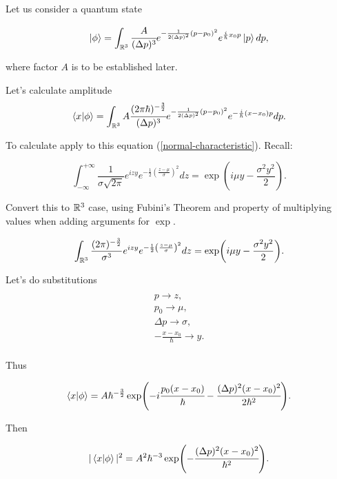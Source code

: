 \documentclass[main.tex]{subfiles}
\begin{document}
Let us consider a quantum state

\begin{equation}
\ket{\phi} = \int_{\mathbb{R}^3} \cfrac{A}{(\Delta p)^3} e^{-\frac{1}{2(\Delta p)^2}(p - p_0)^2} e^{\frac{i}{\hbar}x_0 p}\ket{p} dp,
\end{equation}

where factor $A$ is to be established later. 

Let's calculate amplitude 
\begin{equation}
\bra{x}\ket{\phi} = \int_{\mathbb{R}^3} A \cfrac{ (2\pi\hbar)^{-\frac{3}{2}}}{(\Delta p)^3} e^{-\frac{1}{2(\Delta p)^2}(p - p_0)^2} e^{-\frac{i}{\hbar}(x - x_0) p} dp.
\end{equation}


To calculate apply to this equation (\ref{normal-characteristic}). Recall:

\begin{equation}
\int^{+\infty}_{-\infty} \frac{1}{\sigma \sqrt{2\pi} } e^{izy} e^{-\frac{1}{2}\left(\frac{z-\mu}{\sigma}\right)^2}dz = \exp(i\mu y - \frac{\sigma^2 y^2}{2}).
\end{equation}

Convert this to $\mathbb{R}^3$ case, using Fubini's Theorem and property of multiplying values when adding arguments for $\exp$.

\begin{equation}
\int_{\mathbb{R}^3} \frac{(2\pi)^{-\frac{3}{2}}}{\sigma^3} e^{izy} e^{-\frac{1}{2}\left(\frac{z-\mu}{\sigma}\right)^2}dz = \exp(i\mu y - \frac{\sigma^2 y^2}{2}).
\end{equation}

Let's do substitutions
\begin{multline*}\\
p \to z,\\
p_0 \to \mu, \\
\Delta p \to \sigma, \\
-\frac{x - x_0}{\hbar} \to y.
\\
\end{multline*}

Thus

\begin{equation}
\bra{x}\ket{\phi} = A \hbar^{-\frac{3}{2}}
\exp(-i\cfrac{p_0(x - x_0)}{\hbar} - \cfrac{(\Delta p)^2(x - x_0)^2}{2\hbar^2}).
\end{equation}

Then

\begin{equation}
|\bra{x}\ket{\phi}|^2 = A^2 \hbar^{-3} \exp(- \cfrac{(\Delta p)^2(x - x_0)^2}{\hbar^2}).
\end{equation}
\end{document}
